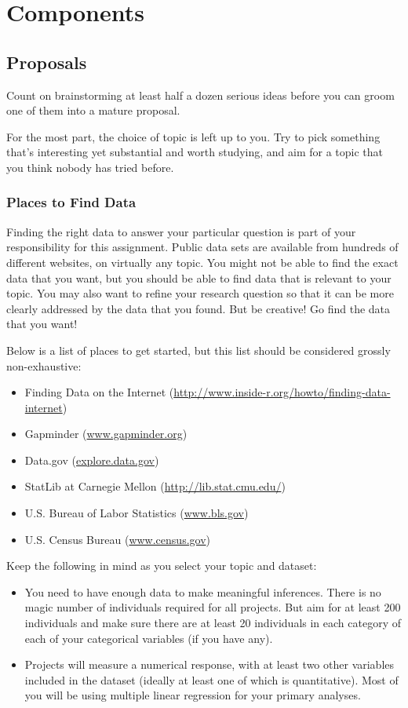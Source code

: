 \documentclass[10pt]{article}
\begin{document}
\section{Components}

\subsection{Proposals}

Count on brainstorming at least half a dozen serious ideas before you can groom one of them into a mature proposal. 

For the most part, the choice of topic is left up to you. Try to pick something that's interesting yet substantial and worth studying, and aim for a topic that you think nobody has tried before.


\subsubsection*{Places to Find Data}
Finding the right data to answer your particular question is part of your responsibility for this assignment. Public data sets are available from hundreds of different websites, on virtually any topic. You might not be able to find the exact data that you want, but you should be able to find data that is relevant to your topic. You may also want to refine your research question so that it can be more clearly addressed by the data that you found. But be creative! Go find the data that you want!

Below is a list of places to get started, but this list should be considered grossly non-exhaustive:

	\begin{itemize}
		\item Finding Data on the Internet (\url{http://www.inside-r.org/howto/finding-data-internet})
		\item Gapminder (\url{www.gapminder.org})
		\item Data.gov (\url{explore.data.gov})
		\item StatLib at Carnegie Mellon (\url{http://lib.stat.cmu.edu/})
		\item U.S. Bureau of Labor Statistics (\url{www.bls.gov})
		\item U.S. Census Bureau (\url{www.census.gov})
	\end{itemize}

	Keep the following in mind as you select your topic and dataset:
	\begin{itemize}
		\item You need to have enough data to make meaningful inferences.  There is no magic number of individuals required for all projects.  But aim for at least 200 individuals and make sure there are at least 20 individuals in each category of each of your categorical variables (if you have any). 
		\item Projects will measure a numerical response, with at least two other variables included in the dataset (ideally at least one of which is quantitative).  Most of you will be using multiple linear regression for your primary analyses.
	\end{itemize}
	
\end{document}
